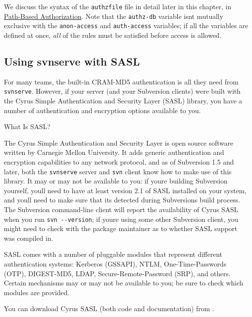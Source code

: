 We discuss the syntax of the \texttt{authzfile} file in detail later in
this chapter, in \hyperref[svn.serverconfig.pathbasedauthz]{Path-Based
Authorization}. Note that the \texttt{authz-db} variable
isn\textquotesingle t mutually exclusive with the \texttt{anon-access}
and \texttt{auth-access} variables; if all the variables are defined at
once, \emph{all} of the rules must be satisfied before access is
allowed.

\subsection{Using svnserve with
SASL}\label{svn.serverconfig.svnserve.sasl}

For many teams, the built-in CRAM-MD5 authentication is all they need
from \texttt{svnserve}. However, if your server (and your Subversion
clients) were built with the Cyrus Simple Authentication and Security
Layer (SASL) library, you have a number of authentication and encryption
options available to you.

What Is SASL?

The Cyrus Simple Authentication and Security Layer is open source
software written by Carnegie Mellon University. It adds generic
authentication and encryption capabilities to any network protocol, and
as of Subversion 1.5 and later, both the \texttt{svnserve} server and
\texttt{svn} client know how to make use of this library. It may or may
not be available to you: if you\textquotesingle re building Subversion
yourself, you\textquotesingle ll need to have at least version 2.1 of
SASL installed on your system, and you\textquotesingle ll need to make
sure that it\textquotesingle s detected during
Subversion\textquotesingle s build process. The Subversion command-line
client will report the availability of Cyrus SASL when you run
\texttt{svn\ -\/-version}; if you\textquotesingle re using some other
Subversion client, you might need to check with the package maintainer
as to whether SASL support was compiled in.

SASL comes with a number of pluggable modules that represent different
authentication systems: Kerberos (GSSAPI), NTLM, One-Time-Passwords
(OTP), DIGEST-MD5, LDAP, Secure-Remote-Password (SRP), and others.
Certain mechanisms may or may not be available to you; be sure to check
which modules are provided.

You can download Cyrus SASL (both code and documentation) from
\href{https://www.cyrusimap.org/sasl/}{}.

